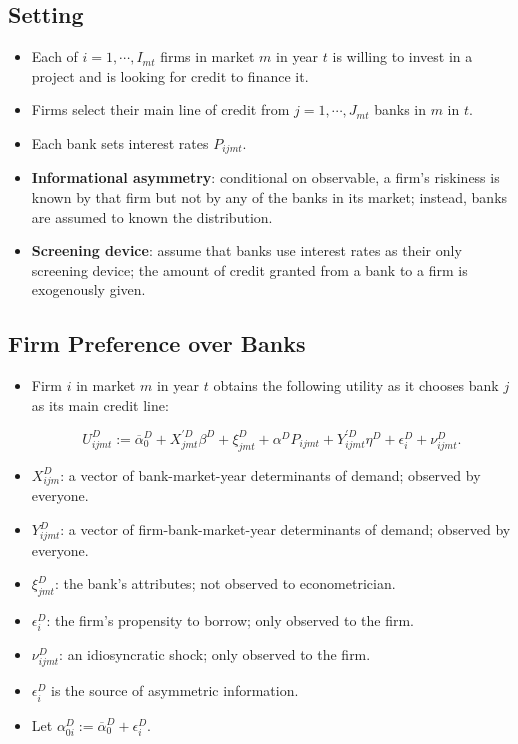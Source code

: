 \documentclass[]{book}
\providecommand{\tightlist}{%
  \setlength{\itemsep}{0pt}\setlength{\parskip}{0pt}}
\begin{document}
\subsection{Setting}\label{setting-6}

\begin{itemize}
\tightlist
\item
  Each of \(i = 1, \cdots, I_{mt}\) firms in market \(m\) in year \(t\)
  is willing to invest in a project and is looking for credit to finance
  it.
\item
  Firms select their main line of credit from \(j = 1, \cdots, J_{mt}\)
  banks in \(m\) in \(t\).
\item
  Each bank sets interest rates \(P_{ijmt}\).
\item
  \textbf{Informational asymmetry}: conditional on observable, a firm's
  riskiness is known by that firm but not by any of the banks in its
  market; instead, banks are assumed to known the distribution.
\item
  \textbf{Screening device}: assume that banks use interest rates as
  their only screening device; the amount of credit granted from a bank
  to a firm is exogenously given.
\end{itemize}

\subsection{Firm Preference over
Banks}\label{firm-preference-over-banks}

\begin{itemize}
\tightlist
\item
  Firm \(i\) in market \(m\) in year \(t\) obtains the following utility
  as it chooses bank \(j\) as its main credit line:

  \begin{equation}
  U_{ijmt}^D := \overline{\alpha}_0^D + X_{jmt}^{\prime D} \beta^D + \xi_{jmt}^D + \alpha^D P_{ijmt} + Y_{ijmt}^{\prime D} \eta^D + \epsilon_i^D + \nu_{ijmt}^D. \label{eq:demand-utility}
  \end{equation}
\item
  \(X_{ijm}^D\): a vector of bank-market-year determinants of demand;
  observed by everyone.
\item
  \(Y_{ijmt}^D\): a vector of firm-bank-market-year determinants of
  demand; observed by everyone.
\item
  \(\xi_{jmt}^D\): the bank's attributes; not observed to
  econometrician.
\item
  \(\epsilon_i^D\): the firm's propensity to borrow; only observed to
  the firm.
\item
  \(\nu_{ijmt}^D\): an idiosyncratic shock; only observed to the firm.
\item
  \(\epsilon_i^D\) is the source of asymmetric information.
\item
  Let \(\alpha_{0i}^D := \overline{\alpha}_0^D + \epsilon_i^D\).
\end{itemize}
\end{document}

